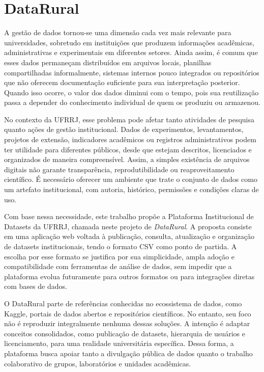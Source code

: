 \chapter{DataRural}\label{chp:PROPOSTA}

A gestão de dados tornou-se uma dimensão cada vez mais relevante para universidades, sobretudo em instituições que produzem informações acadêmicas, administrativas e experimentais em diferentes setores. Ainda assim, é comum que esses dados permaneçam distribuídos em arquivos locais, planilhas compartilhadas informalmente, sistemas internos pouco integrados ou repositórios que não oferecem documentação suficiente para sua interpretação posterior. Quando isso ocorre, o valor dos dados diminui com o tempo, pois sua reutilização passa a depender do conhecimento individual de quem os produziu ou armazenou.

No contexto da UFRRJ, esse problema pode afetar tanto atividades de pesquisa quanto ações de gestão institucional. Dados de experimentos, levantamentos, projetos de extensão, indicadores acadêmicos ou registros administrativos podem ter utilidade para diferentes públicos, desde que estejam descritos, licenciados e organizados de maneira compreensível. Assim, a simples existência de arquivos digitais não garante transparência, reprodutibilidade ou reaproveitamento científico. É necessário oferecer um ambiente que trate o conjunto de dados como um artefato institucional, com autoria, histórico, permissões e condições claras de uso.

Com base nessa necessidade, este trabalho propõe a Plataforma Institucional de Datasets da UFRRJ, chamada neste projeto de \textit{DataRural}. A proposta consiste em uma aplicação web voltada à publicação, consulta, atualização e organização de datasets institucionais, tendo o formato CSV como ponto de partida. A escolha por esse formato se justifica por sua simplicidade, ampla adoção e compatibilidade com ferramentas de análise de dados, sem impedir que a plataforma evolua futuramente para outros formatos ou para integrações diretas com bases de dados.

O DataRural parte de referências conhecidas no ecossistema de dados, como Kaggle, portais de dados abertos e repositórios científicos. No entanto, seu foco não é reproduzir integralmente nenhuma dessas soluções. A intenção é adaptar conceitos consolidados, como publicação de datasets, hierarquia de usuários e licenciamento, para uma realidade universitária específica. Dessa forma, a plataforma busca apoiar tanto a divulgação pública de dados quanto o trabalho colaborativo de grupos, laboratórios e unidades acadêmicas.

